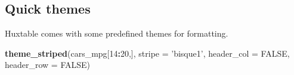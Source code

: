 \documentclass[]{article}
\newenvironment{Shaded}{\begin{snugshade}}{\end{snugshade}}
\newcommand{\KeywordTok}[1]{\textcolor[rgb]{0.13,0.29,0.53}{\textbf{#1}}}
\newcommand{\DataTypeTok}[1]{\textcolor[rgb]{0.13,0.29,0.53}{#1}}
\newcommand{\DecValTok}[1]{\textcolor[rgb]{0.00,0.00,0.81}{#1}}
\newcommand{\StringTok}[1]{\textcolor[rgb]{0.31,0.60,0.02}{#1}}
\newcommand{\OtherTok}[1]{\textcolor[rgb]{0.56,0.35,0.01}{#1}}
\newcommand{\OperatorTok}[1]{\textcolor[rgb]{0.81,0.36,0.00}{\textbf{#1}}}
\newcommand{\NormalTok}[1]{#1}
\begin{document}
\FloatBarrier

\subsection{Quick themes}\label{quick-themes}

Huxtable comes with some predefined themes for formatting.

\begin{Shaded}
\begin{Highlighting}[]
\KeywordTok{theme_striped}\NormalTok{(cars_mpg[}\DecValTok{14}\OperatorTok{:}\DecValTok{20}\NormalTok{,], }\DataTypeTok{stripe =} \StringTok{'bisque1'}\NormalTok{, }\DataTypeTok{header_col =} \OtherTok{FALSE}\NormalTok{, }\DataTypeTok{header_row =} \OtherTok{FALSE}\NormalTok{)}
\end{Highlighting}
\end{Shaded}
\end{document}

